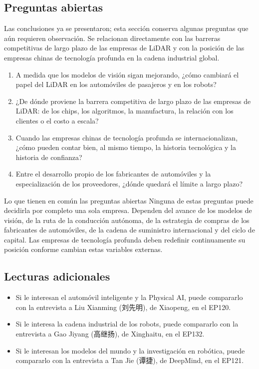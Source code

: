 \subsection{Preguntas abiertas}

Las conclusiones ya se presentaron; esta sección conserva algunas preguntas que aún requieren observación. Se relacionan directamente con las barreras competitivas de largo plazo de las empresas de LiDAR y con la posición de las empresas chinas de tecnología profunda en la cadena industrial global.

\begin{enumerate}
\item A medida que los modelos de visión sigan mejorando, ¿cómo cambiará el papel del LiDAR en los automóviles de pasajeros y en los robots?
\item ¿De dónde proviene la barrera competitiva de largo plazo de las empresas de LiDAR: de los chips, los algoritmos, la manufactura, la relación con los clientes o el costo a escala?
\item Cuando las empresas chinas de tecnología profunda se internacionalizan, ¿cómo pueden contar bien, al mismo tiempo, la historia tecnológica y la historia de confianza?
\item Entre el desarrollo propio de los fabricantes de automóviles y la especialización de los proveedores, ¿dónde quedará el límite a largo plazo?
\end{enumerate}

\begin{warningbox}{Lo que tienen en común las preguntas abiertas}
Ninguna de estas preguntas puede decidirla por completo una sola empresa. Dependen del avance de los modelos de visión, de la ruta de la conducción autónoma, de la estrategia de compras de los fabricantes de automóviles, de la cadena de suministro internacional y del ciclo de capital. Las empresas de tecnología profunda deben redefinir continuamente su posición conforme cambian estas variables externas.
\end{warningbox}

\subsection{Lecturas adicionales}

\begin{itemize}
\item Si le interesan el automóvil inteligente y la Physical AI, puede compararlo con la entrevista a Liu Xianming (刘先明), de Xiaopeng, en el EP120.
\item Si le interesa la cadena industrial de los robots, puede compararlo con la entrevista a Gao Jiyang (高继扬), de Xinghaitu, en el EP132.
\item Si le interesan los modelos del mundo y la investigación en robótica, puede compararlo con la entrevista a Tan Jie (谭捷), de DeepMind, en el EP121.
\end{itemize}


